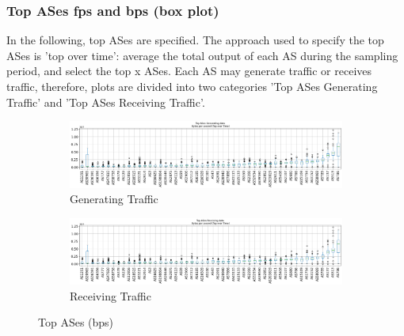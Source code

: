 \documentclass[10pt, journal, letterpaper]{IEEEtran}
\newcommand\boxFigSze{1}
\begin{document}
\subsubsection{Top ASes fps and bps (box plot)}
In the following, top ASes are specified. The approach used to specify the top ASes is 'top over time': average the total output of each AS during the sampling period, and select the top x ASes.
Each AS may generate traffic or receives traffic, therefore, plots are divided into two categories 'Top ASes Generating Traffic' and 'Top ASes Receiving Traffic'.
\begin{figure}
    \begin{subfigure}{\boxFigSze\textwidth}
          \centering
          \includegraphics[width=\columnwidth]{img/top_AS_generating_bps.png}
          \caption{Generating Traffic}
          \label{fig:top_generating_bps}
    \end{subfigure}
    \begin{subfigure}{\boxFigSze\textwidth}
          \centering
          \includegraphics[width=\columnwidth]{img/top_AS_receiving_bps.png}
          \caption{Receiving Traffic}
          \label{fig:top_receiving_bps}
    \end{subfigure}
    \caption{Top ASes (bps)}
    \label{fig:top_AS_bps}
\end{figure}
\end{document}
